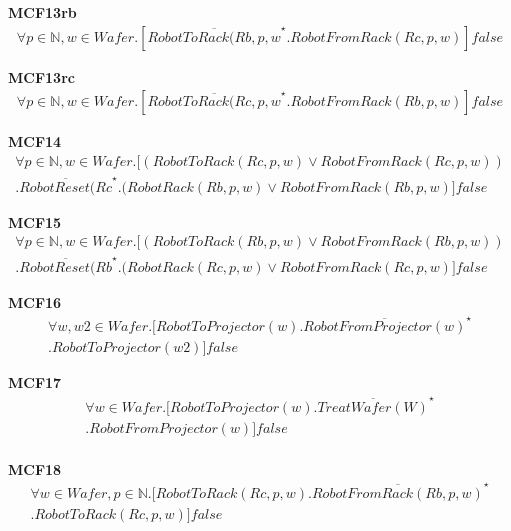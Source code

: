 \documentclass[12pt]{report}
\begin{document}
    \textbf{MCF13rb}
    \begin{multline*}
        [true^{\star}] \forall p \in \mathbb{N}, w \in Wafer.[\overline{RobotToRack(Rb,p,w}^{\star}.RobotFromRack(Rc, p, w)]false
    \end{multline*}

    \textbf{MCF13rc}
    \begin{multline*}
        [true^{\star}] \forall p \in \mathbb{N}, w \in Wafer.[\overline{RobotToRack(Rc,p,w}^{\star}.RobotFromRack(Rb, p, w)]false
    \end{multline*}

    \textbf{MCF14}
    \begin{multline*}
        [true^{\star}] \forall p \in \mathbb{N}, w \in Wafer. [(RobotToRack(Rc,p,w) \vee RobotFromRack(Rc,p,w))\\
        .\overline{RobotReset(Rc}^{\star}.(RobotRack(Rb,p,w) \vee RobotFromRack(Rb,p,w)]false
    \end{multline*}

    \textbf{MCF15}
    \begin{multline*}
        [true^{\star}] \forall p \in \mathbb{N}, w \in Wafer. [(RobotToRack(Rb,p,w) \vee RobotFromRack(Rb,p,w))\\
        .\overline{RobotReset(Rb}^{\star}.(RobotRack(Rc,p,w) \vee RobotFromRack(Rc,p,w)]false
    \end{multline*}

    \textbf{MCF16}
    \begin{multline*}
        [true^{\star}] \forall w,w2 \in Wafer. [RobotToProjector(w).\overline{RobotFromProjector(w)}^{\star} \\
        .RobotToProjector(w2)]false
    \end{multline*}

    \textbf{MCF17}
    \begin{multline*}
        [true^{\star}] \forall w \in Wafer. [RobotToProjector(w).\overline{TreatWafer(W)}^{\star}\\
        .RobotFromProjector(w)]false \\
    \end{multline*}

    \textbf{MCF18}
    \begin{multline*}
        [true^{\star}] \forall w \in Wafer, p \in \mathbb{N}. [RobotToRack(Rc, p, w).\overline{RobotFromRack(Rb,p,w)}^{\star} \\
        .RobotToRack(Rc,p,w)]false
    \end{multline*}
\end{document}

